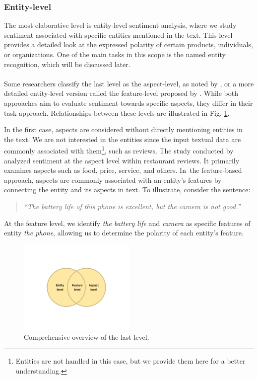 \subsubsection*{Entity-level}
\label{subsubsec:entity-level}
The most elaborative level is entity-level sentiment analysis, where we study sentiment associated with specific entities mentioned in the text. This level provides a detailed look at the expressed polarity of certain products, individuals, or organizations. One of the main tasks in this scope is the named entity recognition, which will be discussed later.

\paragraph{}

Some researchers classify the last level as the aspect-level, as noted by \cite{Wankhade2022}, or a more detailed entity-level version called the feature-level proposed by \cite{Jenifer2017}. While both approaches aim to evaluate sentiment towards specific aspects, they differ in their task approach. Relationships between these levels are illustrated in Fig. \ref{fig:enity-feature-aspect-level}.

In the first case, aspects are considered without directly mentioning entities in the text. We are not interested in the entities since the input textual data are commonly associated with them\footnote{Entities are not handled in this case, but we provide them here for a better understanding.}, such as reviews. The study conducted by \cites{Wang2019} analyzed sentiment at the aspect level within restaurant reviews. It primarily examines aspects such as food, price, service, and others. In~the feature-based approach, aspects are commonly associated with an entity's features by connecting the entity and its aspects in text. To illustrate, consider the sentence:\begin{quote}
    \textit{``The battery life of this phone is excellent, but the camera is not good.''}
\end{quote} At the feature level, we identify \textit{the battery life} and \textit{camera} as specific features of entity \textit{the phone}, allowing us to determine the polarity of each entity's feature.

\begin{figure}[H]
    \centering
    \includegraphics[width=0.5\textwidth]{img/entity-feature-aspect-level.pdf}
    \caption{Comprehensive overview of the last level.}
    \label{fig:enity-feature-aspect-level}
\end{figure}

